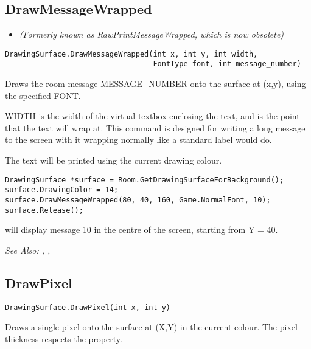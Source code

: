 \subsection{DrawMessageWrapped}\label{DrawingSurface.DrawMessageWrapped}%

\begin{itemize}
\item \it{(Formerly known as RawPrintMessageWrapped, which is now obsolete)}
\end{itemize}

\begin{verbatim}
DrawingSurface.DrawMessageWrapped(int x, int y, int width,
                                  FontType font, int message_number)
\end{verbatim}
Draws the room message MESSAGE_NUMBER onto the surface at (x,y), using the
specified FONT.

WIDTH is the width of the virtual textbox enclosing the text, and is the point that
the text will wrap at. This command is designed for writing a long message to the
screen with it wrapping normally like a standard label would do.

The text will be printed using the current drawing colour.

\begin{verbatim}
DrawingSurface *surface = Room.GetDrawingSurfaceForBackground();
surface.DrawingColor = 14;
surface.DrawMessageWrapped(80, 40, 160, Game.NormalFont, 10);
surface.Release();
\end{verbatim}
will display message 10 in the centre of the screen, starting from Y = 40.

\it{See Also:} ,
,


\subsection{DrawPixel}\label{DrawingSurface.DrawPixel}%

\begin{verbatim}
DrawingSurface.DrawPixel(int x, int y)
\end{verbatim}
Draws a single pixel onto the surface at (X,Y) in the current colour. The pixel
thickness respects the 
property.

